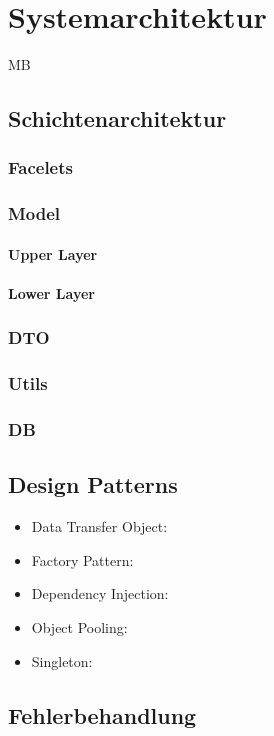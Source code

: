 \chapter{Systemarchitektur}
\begin{tiny}
MB \\
\end{tiny}
\section{Schichtenarchitektur}
    \subsection{Facelets}
    	\subsection{Model}
    	\subsubsection{Upper Layer}
    \subsubsection{Lower Layer}
    \subsection{DTO}
    \subsection{Utils}
    \subsection{DB}
\section{Design Patterns}
	\begin{itemize}
		\item Data Transfer Object:
		\item Factory Pattern:
		\item Dependency Injection:
		\item Object Pooling:
		\item Singleton:
	\end{itemize}
\section{Fehlerbehandlung}		     

